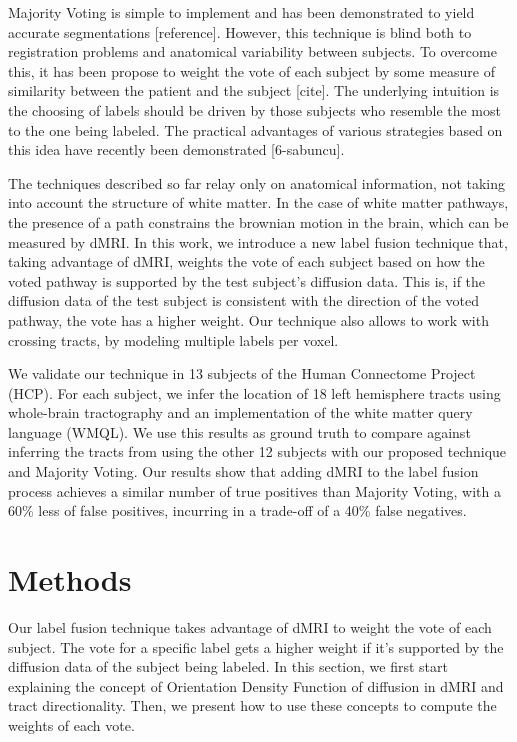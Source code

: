 Majority Voting is simple to implement and has been demonstrated to yield
accurate segmentations [reference]. However, this technique is blind both to
registration problems and anatomical variability between subjects. To overcome
this, it has been propose to weight the vote of each subject by some measure of
 similarity between the patient and the subject [cite]. The underlying
intuition is the choosing of labels should be driven by those subjects who
resemble the most to the one being labeled. The practical advantages of various
strategies based on this idea have recently been demonstrated [6-sabuncu].

The techniques described so far relay only on anatomical information, not taking 
into account the structure of white matter. In the case of white matter pathways,
the presence of a path constrains the brownian motion in the brain, which can be
measured by dMRI. In this work, we introduce a new label fusion technique that,
taking advantage of dMRI, weights the vote of each subject based on how the voted
pathway is supported by the test subject's diffusion data. This is, if the
diffusion data of the test subject is consistent with the direction of the voted
pathway, the vote has a higher weight. Our technique also allows to work with
crossing tracts, by modeling multiple labels per voxel.

We validate our technique in 13 subjects of the Human Connectome Project (HCP).
For each subject, we infer the location of 18 left hemisphere tracts using
whole-brain tractography and an implementation of the white matter query language
(WMQL). We use this results as ground truth to compare against inferring the
tracts from using the other 12 subjects with our proposed technique and Majority
Voting. Our results show that adding dMRI to the label fusion process achieves a
similar number of true positives than Majority Voting, with a 60\% less of
false positives, incurring in a trade-off of a 40\% false negatives.

\section{Methods}

Our label fusion technique takes advantage of dMRI to weight the vote of each
subject. The vote for a specific label gets a higher weight if it's supported
by the diffusion data of the subject being labeled. In this section, we first
start explaining the concept of Orientation Density Function of diffusion in
dMRI and tract directionality. Then, we present how to use these concepts to
compute the weights of each vote.

